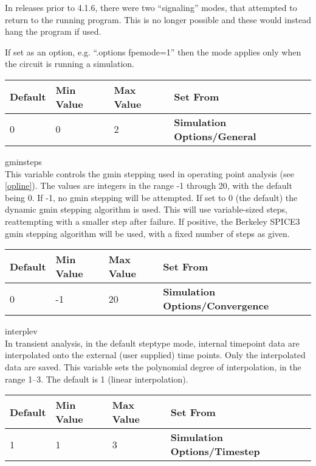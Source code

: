 \begin{description}
In releases prior to 4.1.6, there were two ``signaling'' modes, that
attempted to return to the running program.  This is no longer
possible and these would instead hang the program if used.

If set as an option, e.g. ``{\vt .options fpemode=1}'' then the mode
applies only when the circuit is running a simulation.

\begin{tabular}{|l|l|l|l|}\hline
\bf Default & \bf Min Value & \bf Max Value & \bf Set From\\ \hline
0 & 0 & 2 & \bf Simulation Options/General\\ \hline
\end{tabular}

\item{\et gminsteps}\\
This variable controls the gmin stepping used in operating point
analysis (see \ref{opline}).  The values are integers in the range -1
through 20, with the default being 0.  If -1, no gmin stepping will be
attempted.  If set to 0 (the default) the dynamic gmin stepping
algorithm is used.  This will use variable-sized steps, reattempting
with a smaller step after failure.  If positive, the Berkeley SPICE3
gmin stepping algorithm will be used, with a fixed number of steps as
given.

\begin{tabular}{|l|l|l|l|}\hline
\bf Default & \bf Min Value & \bf Max Value & \bf Set From\\ \hline
0 & -1 & 20 & \bf Simulation Options/Convergence\\ \hline
\end{tabular}

\item{\et interplev}\\
In transient analysis, in the default {\et steptype} mode, internal
timepoint data are interpolated onto the external (user supplied) time
points.  Only the interpolated data are saved.  This variable sets the
polynomial degree of interpolation, in the range 1--3.  The default is
1 (linear interpolation).

\begin{tabular}{|l|l|l|l|}\hline
\bf Default & \bf Min Value & \bf Max Value & \bf Set From\\ \hline
1 & 1 & 3 & \bf Simulation Options/Timestep\\ \hline
\end{tabular}
 

\end{description}
